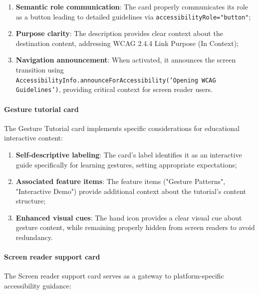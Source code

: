\begin{enumerate}
    \item \textbf{Semantic role communication}: The card properly communicates its role as a button leading to detailed guidelines via \texttt{accessibilityRole="button"};
    
    \item \textbf{Purpose clarity}: The description provides clear context about the destination content, addressing WCAG 2.4.4 Link Purpose (In Context);
    
    \item \textbf{Navigation announcement}: When activated, it announces the screen transition using \\ \texttt{AccessibilityInfo.announceForAccessibility('Opening WCAG Guidelines')}, providing critical context for screen reader users.
\end{enumerate}

\paragraph{Gesture tutorial card}

The Gesture Tutorial card implements specific considerations for educational interactive content:

\begin{enumerate}
    \item \textbf{Self-descriptive labeling}: The card's label identifies it as an interactive guide specifically for learning gestures, setting appropriate expectations;
    
    \item \textbf{Associated feature items}: The feature items ("Gesture Patterns", "Interactive Demo") provide additional context about the tutorial's content structure;
    
    \item \textbf{Enhanced visual cues}: The hand icon provides a clear visual cue about gesture content, while remaining properly hidden from screen readers to avoid redundancy.
\end{enumerate}

\paragraph{Screen reader support card}

The Screen reader support card serves as a gateway to platform-specific accessibility guidance:

